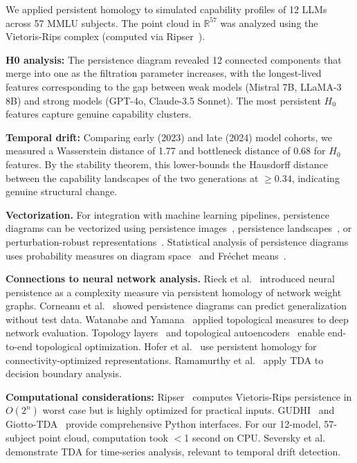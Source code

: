 \documentclass[11pt]{article}
\newcommand{\R}{\mathbb{R}}
\begin{document}
We applied persistent homology to simulated capability profiles of 12 LLMs across 57 MMLU subjects. The point cloud in $\R^{57}$ was analyzed using the Vietoris-Rips complex (computed via Ripser~\cite{ripser}).

\textbf{H0 analysis:} The persistence diagram revealed 12 connected components that merge into one as the filtration parameter increases, with the longest-lived features corresponding to the gap between weak models (Mistral 7B, LLaMA-3 8B) and strong models (GPT-4o, Claude-3.5 Sonnet). The most persistent $H_0$ features capture genuine capability clusters.

\textbf{Temporal drift:} Comparing early (2023) and late (2024) model cohorts, we measured a Wasserstein distance of 1.77 and bottleneck distance of 0.68 for $H_0$ features. By the stability theorem, this lower-bounds the Hausdorff distance between the capability landscapes of the two generations at $\geq 0.34$, indicating genuine structural change.

\textbf{Vectorization.} For integration with machine learning pipelines, persistence diagrams can be vectorized using persistence images~\cite{adams2017persistence}, persistence landscapes~\cite{bubenik2015statistical}, or perturbation-robust representations~\cite{som2020perturbation}. Statistical analysis of persistence diagrams uses probability measures on diagram space~\cite{mileyko2011probability} and Fr\'echet means~\cite{turnerphd}.

\textbf{Connections to neural network analysis.} Rieck et al.~\cite{rieck2019neural} introduced neural persistence as a complexity measure via persistent homology of network weight graphs. Corneanu et al.~\cite{corneanu2020computing} showed persistence diagrams can predict generalization without test data. Watanabe and Yamana~\cite{watanabe2022topological} applied topological measures to deep network evaluation. Topology layers~\cite{gabrielsson2020topology} and topological autoencoders~\cite{moor2020topological} enable end-to-end topological optimization. Hofer et al.~\cite{hofer2019connectivity} use persistent homology for connectivity-optimized representations. Ramamurthy et al.~\cite{ramamurthy2019topological} apply TDA to decision boundary analysis.

\textbf{Computational considerations:} Ripser~\cite{ripser} computes Vietoris-Rips persistence in $O(2^n)$ worst case but is highly optimized for practical inputs. GUDHI~\cite{gudhi2024} and Giotto-TDA~\cite{giotto2021} provide comprehensive Python interfaces. For our 12-model, 57-subject point cloud, computation took $<$1 second on CPU. Seversky et al.~\cite{seversky2016time} demonstrate TDA for time-series analysis, relevant to temporal drift detection.
\end{document}
